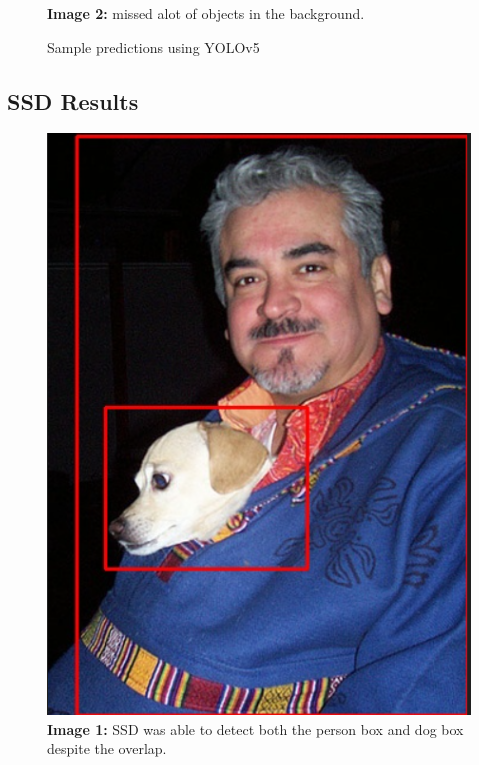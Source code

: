 \documentclass[12pt]{article}
\begin{document}
\begin{figure}[H]
\begin{minipage}[b]{0.45\textwidth}
        \caption*{\textbf{Image 2:} missed alot of objects in the background.}
    \end{minipage}
    \caption{Sample predictions using YOLOv5}
\end{figure}

\subsection*{SSD Results}

\begin{figure}[H]
    \centering
    \begin{minipage}[b]{0.45\textwidth}
        \includegraphics[width=\textwidth]{ssd_result1.png}
        \caption*{\textbf{Image 1:} SSD was able to detect both the person box and dog box despite the overlap.}
    \end{minipage}
    \hfill
    \begin{minipage}[b]{0.45\textwidth}

\end{minipage}
\end{figure}
\end{document}
